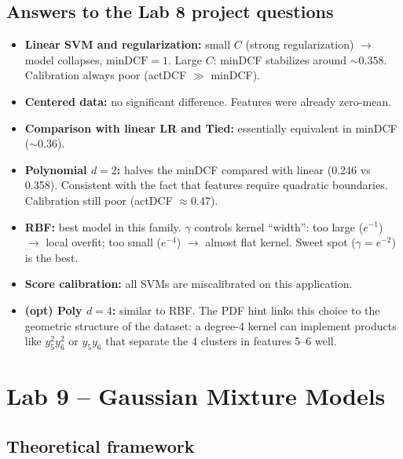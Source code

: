 \documentclass[11pt,a4paper]{article}
\newcommand{\minDCF}{\textrm{minDCF}}
\begin{document}
\subsection{Answers to the Lab 8 project questions}

\begin{itemize}
\item \textbf{Linear SVM and regularization:} small $C$ (strong
      regularization) $\rightarrow$ model collapses, $\minDCF=1$.
      Large $C$: minDCF stabilizes around $\sim 0.358$. Calibration
      always poor (actDCF $\gg$ minDCF).
\item \textbf{Centered data:} no significant difference. Features were
      already zero-mean.
\item \textbf{Comparison with linear LR and Tied:} essentially
      equivalent in minDCF ($\sim 0.36$).
\item \textbf{Polynomial $d=2$:} halves the minDCF compared with
      linear (0.246 vs 0.358). Consistent with the fact that features
      require quadratic boundaries. Calibration still poor (actDCF
      $\approx 0.47$).
\item \textbf{RBF:} best model in this family. $\gamma$ controls
      kernel ``width'': too large ($e^{-1}$) $\rightarrow$ local
      overfit; too small ($e^{-4}$) $\rightarrow$ almost flat kernel.
      Sweet spot ($\gamma=e^{-2}$) is the best.
\item \textbf{Score calibration:} all SVMs are miscalibrated on this
      application.
\item \textbf{(opt) Poly $d=4$:} similar to RBF. The PDF hint links
      this choice to the geometric structure of the dataset: a
      degree-4 kernel can implement products like $y_5^2 y_6^2$ or
      $y_5 y_6$ that separate the 4 clusters in features 5--6 well.
\end{itemize}

\section{Lab 9 -- Gaussian Mixture Models}\label{sec:lab9}

\subsection{Theoretical framework}
\end{document}
